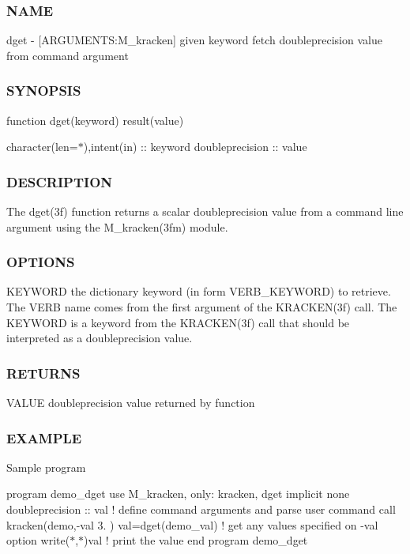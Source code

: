 \subsubsection*{N\+A\+ME}

dget -\/ \mbox{[}A\+R\+G\+U\+M\+E\+N\+TS\+:M\+\_\+kracken\mbox{]} given keyword fetch doubleprecision value from command argument \subsubsection*{S\+Y\+N\+O\+P\+S\+IS}

function dget(keyword) result(value)

character(len=$\ast$),intent(in) \+:\+: keyword doubleprecision \+:\+: value \subsubsection*{D\+E\+S\+C\+R\+I\+P\+T\+I\+ON}

The dget(3f) function returns a scalar doubleprecision value from a command line argument using the M\+\_\+kracken(3fm) module. \subsubsection*{O\+P\+T\+I\+O\+NS}

K\+E\+Y\+W\+O\+RD the dictionary keyword (in form V\+E\+R\+B\+\_\+\+K\+E\+Y\+W\+O\+RD) to retrieve. The V\+E\+RB name comes from the first argument of the K\+R\+A\+C\+K\+E\+N(3f) call. The K\+E\+Y\+W\+O\+RD is a keyword from the K\+R\+A\+C\+K\+E\+N(3f) call that should be interpreted as a doubleprecision value. \subsubsection*{R\+E\+T\+U\+R\+NS}

V\+A\+L\+UE doubleprecision value returned by function \subsubsection*{E\+X\+A\+M\+P\+LE}

Sample program

program demo\+\_\+dget use M\+\_\+kracken, only\+: kracken, dget implicit none doubleprecision \+:\+: val ! define command arguments and parse user command call kracken(\textquotesingle{}demo\textquotesingle{},\textquotesingle{}-\/val 3.\textquotesingle{} ) val=dget(\textquotesingle{}demo\+\_\+val\textquotesingle{}) ! get any values specified on -\/val option write($\ast$,$\ast$)val ! print the value end program demo\+\_\+dget

